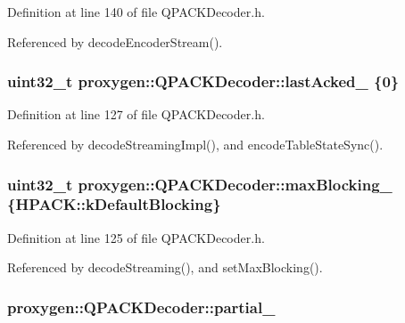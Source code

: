 Definition at line 140 of file Q\+P\+A\+C\+K\+Decoder.\+h.



Referenced by decode\+Encoder\+Stream().

\subsubsection[{last\+Acked\+\_\+}]{\setlength{\rightskip}{0pt plus 5cm}uint32\+\_\+t proxygen\+::\+Q\+P\+A\+C\+K\+Decoder\+::last\+Acked\+\_\+ \{0\}\hspace{0.3cm}{\ttfamily [private]}}\label{classproxygen_1_1QPACKDecoder_a353cd7482bdecc0f0939139822218ed4}


Definition at line 127 of file Q\+P\+A\+C\+K\+Decoder.\+h.



Referenced by decode\+Streaming\+Impl(), and encode\+Table\+State\+Sync().

\subsubsection[{max\+Blocking\+\_\+}]{\setlength{\rightskip}{0pt plus 5cm}uint32\+\_\+t proxygen\+::\+Q\+P\+A\+C\+K\+Decoder\+::max\+Blocking\+\_\+ \{{\bf H\+P\+A\+C\+K\+::k\+Default\+Blocking}\}\hspace{0.3cm}{\ttfamily [private]}}\label{classproxygen_1_1QPACKDecoder_a497a79ebe3005ead366f635c35b86dfb}


Definition at line 125 of file Q\+P\+A\+C\+K\+Decoder.\+h.



Referenced by decode\+Streaming(), and set\+Max\+Blocking().

\subsubsection[{partial\+\_\+}]{ proxygen\+::\+Q\+P\+A\+C\+K\+Decoder\+::partial\+\_\+\hspace{0.3cm}{\ttfamily [private]}}\label{classproxygen_1_1QPACKDecoder_a17006ad10da24b4379d4a253aa6cd7de}


